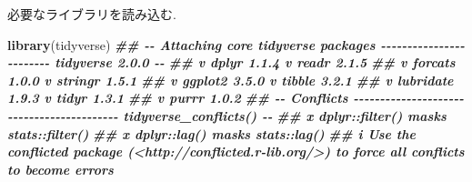 \documentclass[
]{book}
\newenvironment{Shaded}{\begin{snugshade}}{\end{snugshade}}
\newcommand{\CommentTok}[1]{\textcolor[rgb]{0.56,0.35,0.01}{\textit{#1}}}
\newcommand{\ControlFlowTok}[1]{\textcolor[rgb]{0.13,0.29,0.53}{\textbf{#1}}}
\newcommand{\DocumentationTok}[1]{\textcolor[rgb]{0.56,0.35,0.01}{\textbf{\textit{#1}}}}
\newcommand{\FunctionTok}[1]{\textcolor[rgb]{0.13,0.29,0.53}{\textbf{#1}}}
\newcommand{\NormalTok}[1]{#1}
\newcommand{\OtherTok}[1]{\textcolor[rgb]{0.56,0.35,0.01}{#1}}
\newcommand{\SpecialCharTok}[1]{\textcolor[rgb]{0.81,0.36,0.00}{\textbf{#1}}}
\newcommand{\StringTok}[1]{\textcolor[rgb]{0.31,0.60,0.02}{#1}}
\begin{document}
\begin{Shaded}
\end{Shaded}

必要なライブラリを読み込む.

\begin{Shaded}
\begin{Highlighting}[]
\FunctionTok{library}\NormalTok{(tidyverse)}
\DocumentationTok{\#\# {-}{-} Attaching core tidyverse packages {-}{-}{-}{-}{-}{-}{-}{-}{-}{-}{-}{-}{-}{-}{-}{-}{-}{-}{-}{-}{-}{-}{-}{-} tidyverse 2.0.0 {-}{-}}
\DocumentationTok{\#\# v dplyr     1.1.4     v readr     2.1.5}
\DocumentationTok{\#\# v forcats   1.0.0     v stringr   1.5.1}
\DocumentationTok{\#\# v ggplot2   3.5.0     v tibble    3.2.1}
\DocumentationTok{\#\# v lubridate 1.9.3     v tidyr     1.3.1}
\DocumentationTok{\#\# v purrr     1.0.2     }
\DocumentationTok{\#\# {-}{-} Conflicts {-}{-}{-}{-}{-}{-}{-}{-}{-}{-}{-}{-}{-}{-}{-}{-}{-}{-}{-}{-}{-}{-}{-}{-}{-}{-}{-}{-}{-}{-}{-}{-}{-}{-}{-}{-}{-}{-}{-}{-}{-}{-} tidyverse\_conflicts() {-}{-}}
\DocumentationTok{\#\# x dplyr::filter() masks stats::filter()}
\DocumentationTok{\#\# x dplyr::lag()    masks stats::lag()}
\DocumentationTok{\#\# i Use the conflicted package (\textless{}http://conflicted.r{-}lib.org/\textgreater{}) to force all conflicts to become errors}
\end{Highlighting}
\end{Shaded}
\end{document}
